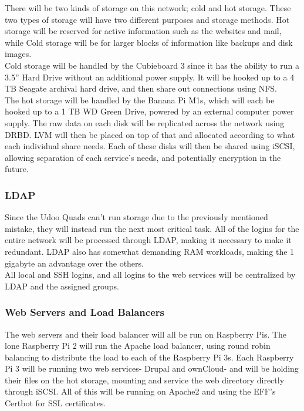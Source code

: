 \documentclass[12pt]{spieman}  %
\begin{document}
There will be two kinds of storage on this network; cold and hot storage. These two types of storage will have two different purposes and storage methods. Hot storage will be reserved for active information such as the websites and mail, while Cold storage will be for larger blocks of information like backups and disk images.\\

Cold storage will be handled by the Cubieboard 3 since it has the ability to run a 3.5” Hard Drive without an additional power supply. It will be hooked up to a 4 TB Seagate archival hard drive, and then share out connections using NFS.\\

The hot storage will be handled by the Banana Pi M1s, which will each be hooked up to a 1 TB WD Green Drive, powered by an external computer power supply. The raw data on each disk will be replicated across the network using DRBD. LVM will then be placed on top of that and allocated according to what each individual share needs. Each of these disks will then be shared using iSCSI, allowing separation of each service's needs, and potentially encryption in the future.

\subsubsection{LDAP}
\label{subsubsec:ldap}

Since the Udoo Quads can’t run storage due to the previously mentioned mistake, they will instead run the next most critical task. All of the logins for the entire network will be processed through LDAP, making it necessary to make it redundant. LDAP also has somewhat demanding RAM workloads, making the 1 gigabyte an advantage over the others.\\

All local and SSH logins, and all logins to the web services will be centralized by LDAP and the assigned groups.

\subsubsection{Web Servers and Load Balancers}
\label{subsubsec:web}

The web servers and their load balancer will all be run on Raspberry Pis. The lone Raspberry Pi 2 will run the Apache load balancer, using round robin balancing to distribute the load to each of the Raspberry Pi 3s. Each Raspberry Pi 3 will be running two web services- Drupal and ownCloud- and will be holding their files on the hot storage, mounting and service the web directory directly through iSCSI. All of this will be running on Apache2 and using the EFF's Certbot for SSL certificates.
\end{document}

